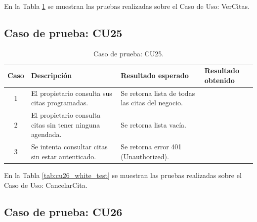 
En la Tabla \ref{tab:cu25_white_test} se muestran las pruebas realizadas sobre el Caso de Uso: VerCitas.

\subsection{Caso de prueba: CU25}

\begin{table}[H]
\centering
\label{tab:cu25_white_test}
\renewcommand{\arraystretch}{1.3}
\begin{tabular}{|c|p{5cm}|p{6cm}|p{2.5cm}|}
\hline
\rowcolor[RGB]{217,217,217}
\textbf{Caso} & \textbf{Descripción} & \textbf{Resultado esperado} & \textbf{Resultado obtenido} \\
\hline

1 &
El propietario consulta sus citas programadas. &
Se retorna lista de todas las citas del negocio. &
 \\
\hline

2 &
El propietario consulta citas sin tener ninguna agendada. &
Se retorna lista vacía. &
 \\
\hline

3 &
Se intenta consultar citas sin estar autenticado. &
Se retorna error 401 (Unauthorized). &
 \\
\hline

\end{tabular}
\caption{Caso de prueba: CU25.}
\label{tab:cu25_white_test}
\end{table}


En la Tabla \ref{tab:cu26_white_test} se muestran las pruebas realizadas sobre el Caso de Uso: CancelarCita.

\subsection{Caso de prueba: CU26}

